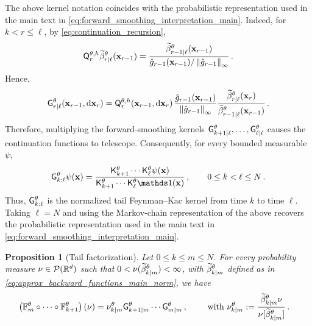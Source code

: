 \documentclass[11pt]{article}
\theoremstyle{plain}
\newtheorem{proposition}[theorem]{Proposition}
\theoremstyle{definition}
\theoremstyle{remark}
\begin{document}
The above kernel notation coincides with the probabilistic
representation used in the main text in \eqref{eq:forward_smoothing_interpretation_main}. Indeed, for $k<r\le \ell$, by
\eqref{eq:continuation_recursion},
$$
\mk{r}[\theta,h] \normbackwardfun{r}{\ell}[\theta](\x_{r-1})
= \frac{\normbackwardfun{r-1}{\ell}[\theta](\x_{r-1}) }{ \approxpot{r-1}(\x_{r-1})/ \norminfty{\approxpot{r-1}} } \eqsp.
$$
Hence,
$$
\fsmk{r}{\ell}[\theta][\x_{r-1}][\rmd\x_r]
= \mk{r}[\theta,h][\x_{r-1}][\rmd\x_r]\, \frac{\approxpot{r-1}(\x_{r-1})} {\norminfty{\approxpot{r-1}}} \frac{ \normbackwardfun{r}{\ell}[\theta][\x_r] }{ \normbackwardfun{r-1}{\ell}[\theta][\x_{r-1}] } \eqsp.
$$
%
Therefore, multiplying the forward-smoothing kernels
$\fsmk{k+1}{\ell}[\theta],\ldots,\fsmk{\ell}{\ell}[\theta]$
causes the continuation functions to telescope. Consequently, for
every bounded measurable $\psi$,
\begin{equation}
\label{eq:forward_smoothing_kernel_form_app}
\prodfsmk{k}{\ell}[\theta]\psi(\x)
= \frac{ \unpredictive{k+1}[\theta]\cdots \unpredictive{\ell}[\theta]\psi(\x) }{ \unpredictive{k+1}[\theta]\cdots \unpredictive{\ell}[\theta]\un(\x) } \eqsp, \qquad 0\le k<\ell\le N \eqsp.
\end{equation}
Thus, $\prodfsmk{k}{\ell}[\theta]$ is the normalized tail
Feynman--Kac kernel from time $k$ to time $\ell$. Taking $\ell=N$ and using the Markov-chain representation of the above recovers the probabilistic representation used in the main text in \eqref{eq:forward_smoothing_interpretation_main}.

\begin{proposition}[Tail factorization]
\label{prop:approx_tail_factorization}
Let $0 \le k \leq m \le N$. For every probability measure $\nu \in \mathcal{P} (\mathbb{R}^d)$ such that $0 < \nu(\normbackwardfun{k}{m}[\theta]) < \infty$, with $\normbackwardfun{k}{m}[\theta]$ defined as in \eqref{eq:approx_backward_functions_main_norm}, we have
\begin{align}
\label{eq:approx_normalized_tail_factorization}
    \left( \filtertransform{m}*[\theta] \circ \cdots \circ \filtertransform{k+1}*[\theta] \right) \left( \nu \right)
    &= \backwardnu{k}{m}[\theta]
    \fsmk{k+1}{m}[\theta]\cdots
    \fsmk{m}{m}[\theta]
    \eqsp,
    \qquad
    \text{ with }
    \backwardnu{k}{m}[\theta]
    \eqdef \frac{ \normbackwardfun{k}{m}[\theta] \nu}{\nu [ \normbackwardfun{k}{m}[\theta] ]} \eqsp.
\end{align}
\end{proposition}
\end{document}
